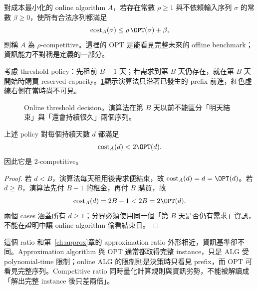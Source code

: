 \documentclass[11pt,a4paper,oneside,openany]{book}
\begin{document}
\begin{definition}
對成本最小化的 online algorithm $A$，若存在常數 $\rho\ge1$ 與不依賴輸入序列 $\sigma$ 的常數 $\beta\ge0$，使所有合法序列都滿足
\[
 \operatorname{cost}_A(\sigma)
 \le \rho\,\OPT(\sigma)+\beta,
\]
則稱 $A$ 為 $\rho$-competitive。這裡的 OPT 是能看見完整未來的 offline benchmark；資訊能力不對稱是定義的一部分。
\end{definition}

考慮 threshold policy：先租前 $B-1$ 天；若需求到第 $B$ 天仍存在，就在第 $B$ 天開始時購買 reserved capacity。\cref{fig:online-threshold}顯示演算法只沿著已發生的 prefix 前進，紅色虛線右側在當時尚不可見。

\begin{figure}[htbp]
\centering
{}
\caption{Online threshold decision。演算法在第 $B$ 天以前不能區分「明天結束」與「還會持續很久」兩個序列。}
\label{fig:online-threshold}
\end{figure}

\begin{theorem}
上述 policy 對每個持續天數 $d$ 都滿足
\[
 \operatorname{cost}_A(d)<2\OPT(d).
\]
因此它是 2-competitive。
\end{theorem}
\begin{proof}
若 $d<B$，演算法每天租用後需求便結束，故 $\operatorname{cost}_A(d)=d=\OPT(d)$。若 $d\ge B$，演算法先付 $B-1$ 的租金，再付 $B$ 購買，故
\[
 \operatorname{cost}_A(d)=2B-1<2B=2\OPT(d).
\]
兩個 cases 涵蓋所有 $d\ge1$；分界必須使用同一個「第 $B$ 天是否仍有需求」資訊，不能在證明中讓 online algorithm 偷看結束日。
\end{proof}

這個 ratio 和第~\ref{ch:approx}章的 approximation ratio 外形相近，資訊基準卻不同。Approximation algorithm 與 OPT 通常都取得完整 instance，只是 ALG 受 polynomial-time 限制；online ALG 的限制則是決策時只看見 prefix，而 OPT 可看見完整序列。Competitive ratio 同時量化計算規則與資訊劣勢，不能被解讀成「解出完整 instance 後只差兩倍」。
\end{document}
